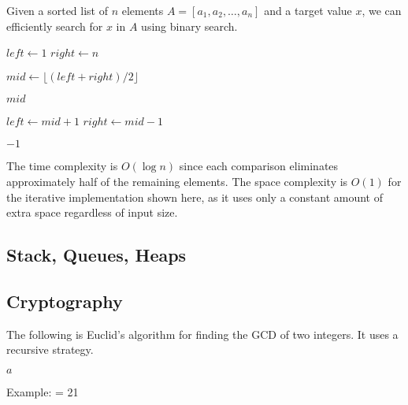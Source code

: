   \begin{algo}
    Given a sorted list of $n$ elements $A = [a_1, a_2, \ldots, a_n]$ and a target value $x$, we can efficiently search for $x$ in $A$ using binary search.
    \begin{algorithmic}[1]
       
        \State $left \gets 1$ 
        \State $right \gets n$ 
        
         
          \State $mid \gets \lfloor (left + right) / 2 \rfloor$ 
          
           
            \State \Return $mid$ 
          \EndIf
          
           
            \State $left \gets mid + 1$ 
          \Else {}
            \State $right \gets mid - 1$ 
          \EndIf
        \EndWhile
        
        \State \Return $-1$ 
      \EndProcedure
    \end{algorithmic}
    The time complexity is $O(\log n)$ since each comparison eliminates approximately half of the remaining elements. The space complexity is $O(1)$ for the iterative implementation shown here, as it uses only a constant amount of extra space regardless of input size.
  \end{algo}

\subsection{Stack, Queues, Heaps}

\subsection{Cryptography} 

  \begin{algo}
    The following is Euclid's algorithm for finding the GCD of two integers. It uses a recursive strategy. 
    \begin{algorithmic}[1]
       
         
          \State \Return $a$
         
          \State \Return {}
        \Else {}
          \State \Return {}
        \EndIf
      \EndProcedure
    \end{algorithmic}
    Example:  = 21
  \end{algo}

